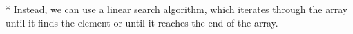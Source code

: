 \documentclass[preview]{standalone}
\begin{document}
* Instead, we can use a linear search algorithm, which iterates through the array until it finds the element or until it reaches the end of the array.\\
\end{document}
